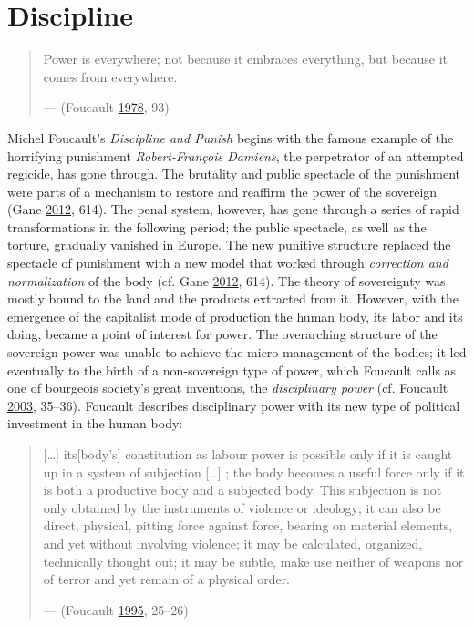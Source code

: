 \documentclass[12pt,twoside]{report}
\begin{document}
\hypertarget{discipline}{%
\section{Discipline}\label{discipline}}

\begin{quote}
Power is everywhere; not because it embraces everything, but because it comes from everywhere.

--- (Foucault \protect\hyperlink{ref-Foucault1978}{1978}, 93)
\end{quote}

Michel Foucault's \emph{Discipline and Punish} begins with the famous example of the horrifying punishment \emph{Robert-François Damiens}, the perpetrator of an attempted regicide, has gone through. The brutality and public spectacle of the punishment were parts of a mechanism to restore and reaffirm the power of the sovereign (Gane \protect\hyperlink{ref-Gane2012}{2012}, 614). The penal system, however, has gone through a series of rapid transformations in the following period; the public spectacle, as well as the torture, gradually vanished in Europe. The new punitive structure replaced the spectacle of punishment with a new model that worked through \emph{correction and normalization} of the body (cf. Gane \protect\hyperlink{ref-Gane2012}{2012}, 614). The theory of sovereignty was mostly bound to the land and the products extracted from it. However, with the emergence of the capitalist mode of production the human body, its labor and its doing, became a point of interest for power. The overarching structure of the sovereign power was unable to achieve the micro-management of the bodies; it led eventually to the birth of a non-sovereign type of power, which Foucault calls as one of bourgeois society's great inventions, the \emph{disciplinary power} (cf. Foucault \protect\hyperlink{ref-Foucault2003}{2003}, 35--36). Foucault describes disciplinary power with its new type of political investment in the human body:

\begin{quote}
{[}\ldots{}{]} its{[}body's{]} constitution as labour power is possible only if it is caught up in a system of subjection {[}\ldots{}{]} ; the body becomes a useful force only if it is both a productive body and a subjected body. This subjection is not only obtained by the instruments of violence or ideology; it can also be direct, physical, pitting force against force, bearing on material elements, and yet without involving violence; it may be calculated, organized, technically thought out; it may be subtle, make use neither of weapons nor of terror and yet remain of a physical order.

--- (Foucault \protect\hyperlink{ref-Foucault1995}{1995}, 25--26)
\end{quote}
\end{document}
